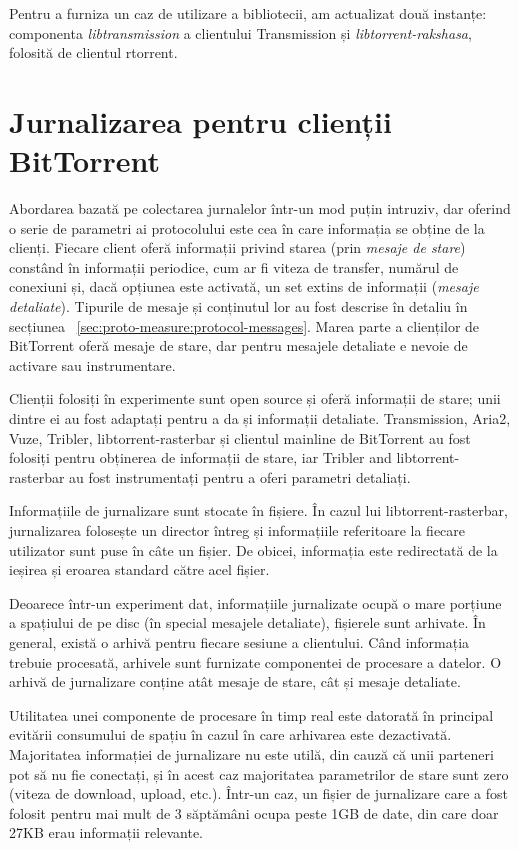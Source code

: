 Pentru a furniza un caz de utilizare a bibliotecii, am actualizat două
instanțe: componenta \textit{libtransmission} a clientului Transmission
și \textit{libtorrent-rakshasa}, folosită de clientul rtorrent.

\section{Jurnalizarea pentru clienții BitTorrent}
\label{sec:proto-measure:log-collect}

Abordarea bazată pe colectarea jurnalelor într-un mod puțin intruziv, dar
oferind o serie de parametri ai protocolului este cea în care informația se
obține de la clienți. Fiecare client oferă informații privind starea
(prin \textit{mesaje de stare}) constând în informații periodice, cum ar
fi viteza de transfer, numărul de conexiuni și, dacă opțiunea este activată,
un set extins de informații (\textit{mesaje detaliate}). Tipurile de mesaje și
conținutul lor au fost descrise în detaliu în secțiunea ~\ref{sec:proto-measure:protocol-messages}. Marea parte a clienților de BitTorrent oferă mesaje de
stare, dar pentru mesajele detaliate e nevoie de activare sau instrumentare.

Clienții folosiți în experimente sunt open source și oferă informații de
stare; unii dintre ei au fost adaptați pentru a da și informații detaliate.
Transmission, Aria2, Vuze, Tribler, libtorrent-rasterbar și clientul mainline
de BitTorrent au fost folosiți pentru obținerea de informații de stare, iar
Tribler and libtorrent-rasterbar au fost instrumentați pentru a oferi
parametri detaliați.

Informațiile de jurnalizare sunt stocate în fișiere. În cazul lui
libtorrent-rasterbar, jurnalizarea folosește un director întreg și
informațiile referitoare la fiecare utilizator sunt puse în câte un fișier.
De obicei, informația este redirectată de la ieșirea și eroarea standard
către acel fișier.

Deoarece într-un experiment dat, informațiile jurnalizate ocupă o mare porțiune
a spațiului de pe disc (în special mesajele detaliate), fișierele sunt
arhivate. În general, există o arhivă pentru fiecare sesiune a clientului. Când
informația trebuie procesată, arhivele sunt furnizate componentei de procesare
a datelor. O arhivă de jurnalizare conține atât mesaje de stare, cât și
mesaje detaliate.

Utilitatea unei componente de procesare în timp real este datorată în
principal evitării consumului de spațiu în cazul în care arhivarea este
dezactivată. Majoritatea informației de jurnalizare nu este utilă, din cauză
că unii parteneri pot să nu fie conectați, și în acest caz majoritatea
parametrilor de stare sunt zero (viteza de download, upload, etc.). Într-un caz,
un fișier de jurnalizare care a fost folosit pentru mai mult de 3 săptămâni
ocupa peste 1GB de date, din care doar 27KB erau informații relevante.

